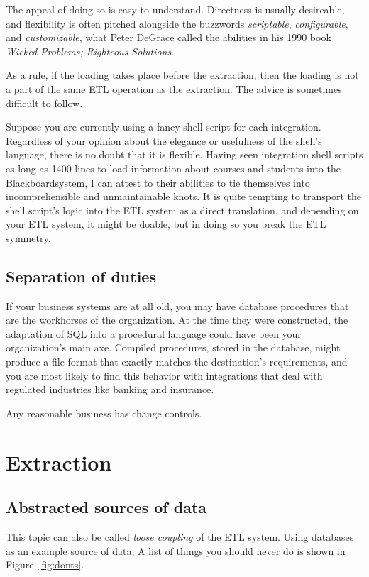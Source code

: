 \documentclass[11pt,letterpaper,twosided]{memoir}
\begin{document}
The appeal of doing so is easy to understand. Directness is usually
desireable, and flexibility is often pitched alongside the buzzwords
\emph{scriptable}, \emph{configurable}, and \emph{customizable}, 
what Peter DeGrace called the abilities in his 1990 book \emph{Wicked
Problems; Righteous Solutions}.

As a rule, if the loading takes place before the extraction, then the
loading is not a part of the same ETL operation as the extraction. 
The advice is sometimes difficult to follow. 

Suppose you are currently using a fancy shell script for each
integration. Regardless of your opinion about the elegance or
usefulness of the shell's language, there is no doubt that it is
flexible. Having seen integration shell scripts as long as 1400
lines to load information about courses and students into the
Blackboard\CircleR\thinspace system, I can attest to their abilities
to tie themselves into incomprehensible and unmaintainable knots.
It is quite tempting to transport the shell script's logic into the
ETL system as a direct translation, and depending on your ETL system,
it might be doable, but in doing so you break the ETL symmetry.

\subsection{Separation of duties}

If your business systems are at all old, you may have database
procedures that are the workhorses of the organization. At the time
they were constructed, the adaptation of SQL into a procedural language
could have been your organization's main axe. Compiled procedures,
stored in the database, might produce a file format that exactly 
matches the destination's requirements, and you are most likely to
find this behavior with integrations that deal with regulated 
industries like banking and insurance.

Any reasonable business has change controls. 

\section{Extraction}

\subsection{Abstracted sources of data}

This topic can also be called \emph{loose coupling} of the ETL
system. Using databases as an example source of data, A list of 
things you should never do is shown in Figure~\ref{fig:donts}.
\end{document}
